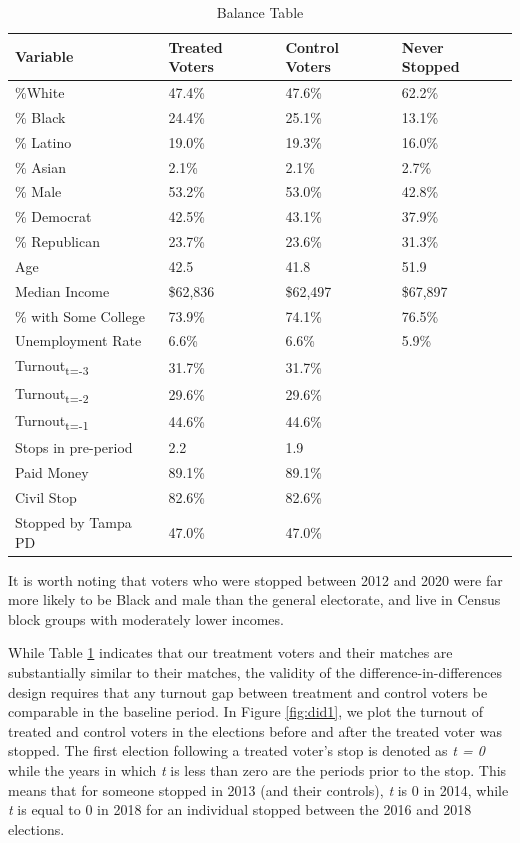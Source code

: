 \documentclass[
  12pt,
]{article}
\begin{document}
\begin{singlespace}
\begin{table}[!h]

\caption{\label{tab:baltab-chunk}\label{tab:balance} Balance Table}
\centering
\begin{tabular}[t]{llll}
\toprule
Variable & Treated Voters & Control Voters & Never Stopped\\
\midrule
\%White & 47.4\% & 47.6\% & 62.2\%\\
\% Black & 24.4\% & 25.1\% & 13.1\%\\
\% Latino & 19.0\% & 19.3\% & 16.0\%\\
\% Asian & 2.1\% & 2.1\% & 2.7\%\\
\% Male & 53.2\% & 53.0\% & 42.8\%\\
\% Democrat & 42.5\% & 43.1\% & 37.9\%\\
\% Republican & 23.7\% & 23.6\% & 31.3\%\\
Age & 42.5 & 41.8 & 51.9\\
Median Income & \$62,836 & \$62,497 & \$67,897\\
\% with Some College & 73.9\% & 74.1\% & 76.5\%\\
Unemployment Rate & 6.6\% & 6.6\% & 5.9\%\\
Turnout\textsubscript{t=-3} & 31.7\% & 31.7\% & \\
Turnout\textsubscript{t=-2} & 29.6\% & 29.6\% & \\
Turnout\textsubscript{t=-1} & 44.6\% & 44.6\% & \\
Stops in pre-period & 2.2 & 1.9 & \\
Paid Money & 89.1\% & 89.1\% & \\
Civil Stop & 82.6\% & 82.6\% & \\
Stopped by Tampa PD & 47.0\% & 47.0\% & \\
\bottomrule
\end{tabular}
\end{table}
\end{singlespace}

It is worth noting that voters who were stopped between 2012 and 2020 were far more likely to be Black and male than the general electorate, and live in Census block groups with moderately lower incomes.

While Table \ref{tab:balance} indicates that our treatment voters and their matches are substantially similar to their matches, the validity of the difference-in-differences design requires that any turnout gap between treatment and control voters be comparable in the baseline period. In Figure \ref{fig:did1}, we plot the turnout of treated and control voters in the elections before and after the treated voter was stopped. The first election following a treated voter's stop is denoted as \emph{t = 0} while the years in which \emph{t} is less than zero are the periods prior to the stop. This means that for someone stopped in 2013 (and their controls), \emph{t} is 0 in 2014, while \emph{t} is equal to 0 in 2018 for an individual stopped between the 2016 and 2018 elections.
\end{document}
